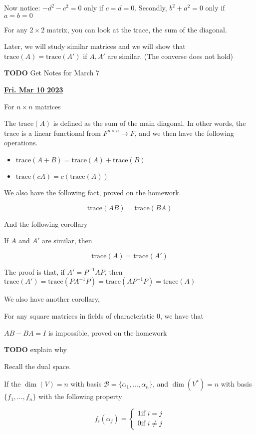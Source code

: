 \documentclass[12pt]{article}
\def\trace{\text{trace}}
\def\B{\mathcal B}
\renewcommand{\date}[1]{\underline{\bf #1}}
\newcommand{\TODO}{\color{red}\textbf{TODO}\color{black}}
\begin{document}
  Now notice: $-d^2 - c^2 = 0$ only if $c = d = 0$. Secondly, $b^2 + a^2 = 0$
  only if $a = b = 0$

  For any $2 \times 2$ matrix, you can look at the trace, the sum of the
  diagonal.

  Later, we will study similar matrices and we will show that $\text{trace}(A) =
  \text{trace}(A')$ if $A, A'$ are similar. (The converse does not hold)

  \TODO{} Get Notes for March 7

  \date{Fri. Mar 10 2023}

  For $n \times n$ matrices

  The $\trace(A)$ is defined as the sum of the main diagonal. In other words,
  the trace is a linear functional from $F^{n \times n} \to F$, and we then have
  the following operations.

  \begin{itemize}
    \item $\trace(A + B) = \trace(A) + \trace(B)$
    \item $\trace(cA) = c(\trace(A))$
  \end{itemize}

  We also have the following fact, proved on the homework.

  \[
    \trace(AB) = \trace(BA)
  \]

  And the following corollary

  If $A$ and $A'$ are similar, then

  \[
    \trace(A) = \trace(A')
  \]

  The proof is that, if $A' = P^{-1} A P$, then $\trace(A') = \trace(P A^{-1} P)
  = \trace(A P^{-1} P) = \trace(A)$

  We also have another corollary,

  For any square matrices in fields of characteristic $0$, we have that

  $AB - BA = I$ is impossible, proved on the homework

  \TODO{} explain why

  Recall the dual space.

  If the $\dim(V) = n$ with basis $\B = \{\alpha_1, \dots, \alpha_n\}$, and
  $\dim(V^*) = n$ with basis $\{f_1, \dots, f_n \}$ with the following property

  \[
    f_i(\alpha_j) = \begin{cases}
      1 \text{if $i = j$} \\
      0 \text{if $i \ne j$}
    \end{cases}
  \]
\end{document}
